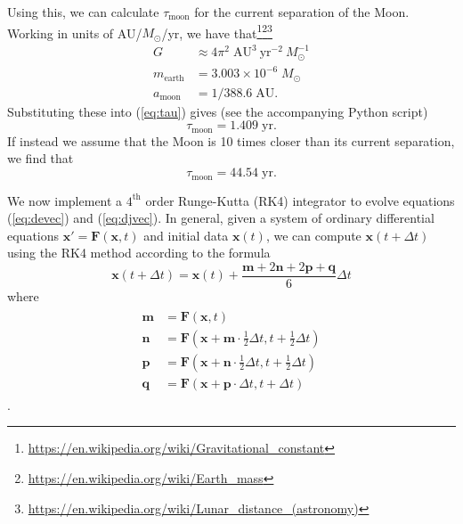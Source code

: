 \documentclass[10pt]{article}
\newcommand{\xvec}{\mathbf{x}}
\begin{document}
Using this, we can calculate $\tau_{\mathrm{moon}}$ for the current separation of the Moon. Working in units of AU/$M_\odot$/yr, we have that\footnote{\url{https://en.wikipedia.org/wiki/Gravitational\_constant}}\footnote{\url{https://en.wikipedia.org/wiki/Earth\_mass}}\footnote{\url{https://en.wikipedia.org/wiki/Lunar\_distance\_(astronomy)}}
\begin{align*}
    G &\approx 4 \pi^2 \; \mathrm{AU}^3 \: \mathrm{yr}^{-2} \: M_\odot^{-1} \\
    m_{\mathrm{earth}} &= 3.003 \times 10^{-6} \; M_\odot \\
    a_{\mathrm{moon}} &= 1/388.6 \; \mathrm{AU}.
\end{align*}
Substituting these into (\ref{eq:tau}) gives (see the accompanying Python script)
\[
    \tau_{\mathrm{moon}} = 1.409 \; \mathrm{yr}.
\]
If instead we assume that the Moon is 10 times closer than its current separation, we find that
\[
    \tau_{\mathrm{moon}} = 44.54 \; \mathrm{yr}.
\]

We now implement a $4^\mathrm{th}$ order Runge-Kutta (RK4) integrator to evolve equations (\ref{eq:devec}) and (\ref{eq:djvec}). In general, given a system of ordinary differential equations $\xvec' = \mathbf{F}(\xvec, t)$ and initial data $\xvec(t)$, we can compute $\xvec(t + \Delta t)$ using the RK4 method according to the formula
\begin{equation} \label{eq:RK4}
    \xvec(t + \Delta t) = \xvec(t) + \frac{\mathbf{m} + 2\mathbf{n} + 2\mathbf{p} + \mathbf{q}}{6} \Delta t
\end{equation}
where
\begin{align}
\begin{split} \label{eq:RK4_derivatives}
    \mathbf{m} &= \mathbf{F} \left( \xvec, t \right) \\
    \mathbf{n} &= \mathbf{F} \left( \xvec + \textbf{m} \cdot \tfrac{1}{2} \Delta t, t + \tfrac{1}{2} \Delta t \right) \\
    \mathbf{p} &= \mathbf{F} \left( \xvec + \textbf{n} \cdot \tfrac{1}{2} \Delta t, t + \tfrac{1}{2} \Delta t \right) \\
    \mathbf{q} &= \mathbf{F} \left( \xvec + \textbf{p} \cdot \Delta t, t + \Delta t \right)
\end{split}
\end{align}
\parencite{hirsch2013}.

\printbibliography
\end{document}
